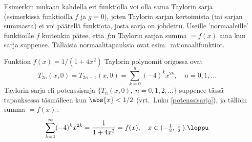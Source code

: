 Esimerkin mukaan kahdella eri funktiolla voi olla sama Taylorin sarja (esimerkissä funktioilla 
$f$ ja $g=0$), joten Taylorin sarjan kertoimista (tai sarjan summasta) ei voi päätellä 
funktiota, josta sarja on johdettu. Useille 'normaaleille' funktioille $f$ kuitenkin pätee,
että $f$:n Taylorin sarjan summa $=f(x)$ aina kun sarja suppenee. Tällaisia normaalitapauksia
ovat esim.\ rationaalifunktiot.
\begin{Exa}
Funktion $f(x)=1/(1+4x^2)$ Taylorin polynomit origossa ovat
\[
T_{2n}(x,0)=T_{2n+1}(x,0)=\sum_{k=0}^n (-4)^kx^{2k},\quad n=0,1,\ldots
\]
Taylorin sarja eli potenssisarja $\{T_n(x,0), \ n=0,1,2,\ldots\}$ suppenee tässä tapauksessa
täsmälleen kun $\abs{x}<1/2$ (vrt.\ Luku \ref{potenssisarja}), ja tällöin summa $=f(x)$\,:
\[
\sum_{k=0}^\infty (-4)^kx^{2k} = \frac{1}{1+4x^2} 
                               = f(x), \quad x \in (-\tfrac{1}{2},\,\tfrac{1}{2}\,). \loppu
\]
\end{Exa}

